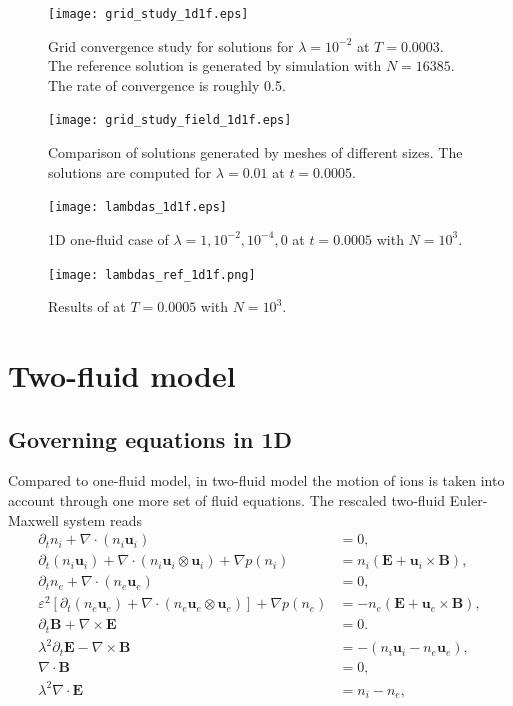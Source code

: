 \documentclass{report}
\begin{document}
\begin{figure}
    \centering
    \texttt{[image: grid\_study\_1d1f.eps]}
    \caption{Grid convergence study for solutions for $\lambda = 10^{-2}$ at $T = 0.0003$. The reference solution is generated by simulation with $N = 16385$. The rate of convergence is roughly 0.5.}
    \label{fig:grid_study_1d1f}
\end{figure}
\begin{figure}
    \centering
    \texttt{[image: grid\_study\_field\_1d1f.eps]}
    \caption{Comparison of solutions generated by meshes of different sizes. The solutions are computed for $\lambda = 0.01$ at $t=0.0005$.}
    \label{fig:grid_study_field_1d1f}
\end{figure}
\begin{figure}
    \centering
    \texttt{[image: lambdas\_1d1f.eps]}
    \caption{1D one-fluid case of $\lambda = 1, 10^{-2}, 10^{-4}, 0$ at $t = 0.0005$ with $N = 10^3$.}
    \label{fig:lambdas_1d1f}
\end{figure}
\begin{figure}
    \centering
    \texttt{[image: lambdas\_ref\_1d1f.png]}
    \caption{Results of \cite{degond_2012} at $T = 0.0005$ with $N = 10^3$. }
    \label{fig:lambdas_ref_1d1f}
\end{figure}

\section{Two-fluid model} \label{sec:two_fluid_model}
\subsection{Governing equations in 1D} \label{sec:1d_two_fluid_equations}
Compared to one-fluid model, in two-fluid model the motion of ions is taken into account through one more set of fluid equations. The rescaled two-fluid Euler-Maxwell system reads
\begin{align*}
    \partial_t n_i + \nabla\cdot(n_i \mathbf{u}_i) &= 0, \\
    \partial_t (n_i \mathbf{u}_i) + \nabla \cdot (n_i \mathbf{u}_i \otimes \mathbf{u}_i) + \nabla p(n_i) &= n_i(\mathbf{E} + \mathbf{u}_i \times \mathbf{B}),\\
    \partial_t n_e + \nabla\cdot(n_e \mathbf{u}_e) &= 0, \\
    \varepsilon^2[\partial_t (n_e \mathbf{u}_e) + \nabla \cdot (n_e \mathbf{u}_e \otimes \mathbf{u}_e)] + \nabla p(n_e) &= -n_e(\mathbf{E} + \mathbf{u}_e \times \mathbf{B}),\\
    \partial_t \mathbf{B} + \nabla \times \mathbf{E} &= 0. \\
    \lambda^2 \partial_t\mathbf{E} - \nabla \times \mathbf{B} &= -(n_i \mathbf{u}_i - n_e \mathbf{u}_e),\\
    \nabla\cdot \mathbf{B} &= 0, \\
    \lambda^2 \nabla\cdot \mathbf{E} &= n_i - n_e,
\end{align*}
\end{document}
